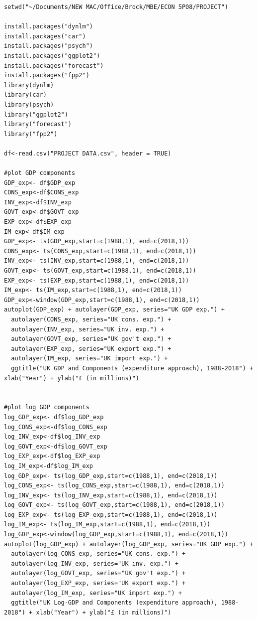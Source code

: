 \documentclass[12pt]{article}
\begin{document}
\begin{verbatim}
setwd("~/Documents/NEW MAC/Office/Brock/MBE/ECON 5P08/PROJECT")

install.packages("dynlm")
install.packages("car")
install.packages("psych")
install.packages("ggplot2")
install.packages("forecast")
install.packages("fpp2")
library(dynlm)
library(car)
library(psych)
library("ggplot2")
library("forecast")
library("fpp2")

df<-read.csv("PROJECT DATA.csv", header = TRUE)

#plot GDP components
GDP_exp<- df$GDP_exp
CONS_exp<-df$CONS_exp
INV_exp<-df$INV_exp
GOVT_exp<-df$GOVT_exp
EXP_exp<-df$EXP_exp
IM_exp<-df$IM_exp
GDP_exp<- ts(GDP_exp,start=c(1988,1), end=c(2018,1))
CONS_exp<- ts(CONS_exp,start=c(1988,1), end=c(2018,1))
INV_exp<- ts(INV_exp,start=c(1988,1), end=c(2018,1))
GOVT_exp<- ts(GOVT_exp,start=c(1988,1), end=c(2018,1))
EXP_exp<- ts(EXP_exp,start=c(1988,1), end=c(2018,1))
IM_exp<- ts(IM_exp,start=c(1988,1), end=c(2018,1))
GDP_exp<-window(GDP_exp,start=c(1988,1), end=c(2018,1)) 
autoplot(GDP_exp) + autolayer(GDP_exp, series="UK GDP exp.") +
  autolayer(CONS_exp, series="UK cons. exp.") +
  autolayer(INV_exp, series="UK inv. exp.") +
  autolayer(GOVT_exp, series="UK gov't exp.") +
  autolayer(EXP_exp, series="UK export exp.") +
  autolayer(IM_exp, series="UK import exp.") +
  ggtitle("UK GDP and Components (expenditure approach), 1988-2018") + xlab("Year") + ylab("£ (in millions)")

  
#plot log GDP components
log_GDP_exp<- df$log_GDP_exp
log_CONS_exp<-df$log_CONS_exp
log_INV_exp<-df$log_INV_exp
log_GOVT_exp<-df$log_GOVT_exp
log_EXP_exp<-df$log_EXP_exp
log_IM_exp<-df$log_IM_exp
log_GDP_exp<- ts(log_GDP_exp,start=c(1988,1), end=c(2018,1))
log_CONS_exp<- ts(log_CONS_exp,start=c(1988,1), end=c(2018,1))
log_INV_exp<- ts(log_INV_exp,start=c(1988,1), end=c(2018,1))
log_GOVT_exp<- ts(log_GOVT_exp,start=c(1988,1), end=c(2018,1))
log_EXP_exp<- ts(log_EXP_exp,start=c(1988,1), end=c(2018,1))
log_IM_exp<- ts(log_IM_exp,start=c(1988,1), end=c(2018,1))
log_GDP_exp<-window(log_GDP_exp,start=c(1988,1), end=c(2018,1)) 
autoplot(log_GDP_exp) + autolayer(log_GDP_exp, series="UK GDP exp.") +
  autolayer(log_CONS_exp, series="UK cons. exp.") +
  autolayer(log_INV_exp, series="UK inv. exp.") +
  autolayer(log_GOVT_exp, series="UK gov't exp.") +
  autolayer(log_EXP_exp, series="UK export exp.") +
  autolayer(log_IM_exp, series="UK import exp.") +
  ggtitle("UK Log-GDP and Components (expenditure approach), 1988-2018") + xlab("Year") + ylab("£ (in millions)")



\end{verbatim}
\end{document}
